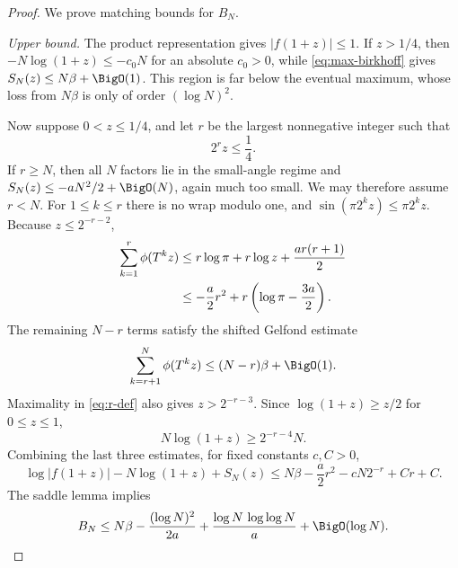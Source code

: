 \documentclass[11pt,oneside]{article}
\theoremstyle{definition}
\theoremstyle{remark}
\newcommand{\T}{T}
\begin{document}
\begin{proof}
We prove matching bounds for $B_N$.

\emph{Upper bound.}
The product representation gives $|f(1+z)|\le1$.  If $z>1/4$, then
$-N\log(1+z)\le-c_0N$ for an absolute $c_0>0$, while
\eqref{eq:max-birkhoff} gives $S_N(z)\le N\beta+\BigO(1)$.
This region is far below the eventual maximum, whose loss from $N\beta$ is
only of order $(\log N)^2$.

Now suppose $0<z\le1/4$, and let $r$ be the largest nonnegative integer such
that
\begin{equation}
 2^rz\le\frac14.                                            \label{eq:r-def}
\end{equation}
If $r\ge N$, then all $N$ factors lie in the small-angle regime and
$S_N(z)\le-aN^2/2+\BigO(N)$, again much too small.  We may therefore assume
$r<N$.  For $1\le k\le r$ there is no wrap modulo one, and
$\sin(\pi2^kz)\le\pi2^kz$.  Because
$z\le2^{-r-2}$,
\begin{align}
 \sum_{k=1}^{r}\phi(\T^kz)
 &\le r\log\pi+r\log z+\frac{ar(r+1)}2\notag\\
 &\le-\frac a2r^2+r\left(\log\pi-\frac{3a}{2}\right).     \label{eq:transient-upper}
\end{align}
The remaining $N-r$ terms satisfy the shifted Gelfond estimate
\[
 \sum_{k=r+1}^{N}\phi(\T^kz)
 \le(N-r)\beta+\BigO(1).
\]
Maximality in \eqref{eq:r-def} also gives $z>2^{-r-3}$.  Since
$\log(1+z)\ge z/2$ for $0\le z\le1$,
\[
 N\log(1+z)\ge2^{-r-4}N.
\]
Combining the last three estimates, for fixed constants $c,C>0$,
\begin{equation}
 \log|f(1+z)|-N\log(1+z)+S_N(z)
 \le N\beta-\frac a2r^2-cN2^{-r}+Cr+C.                    \label{eq:BN-upper-r}
\end{equation}
The saddle lemma implies
\begin{equation}
 B_N\le N\beta-
\frac{(\log N)^2}{2a}
 +\frac{\log N\,\log\log N}{a}+\BigO(\log N).             \label{eq:BN-upper}
\end{equation}


\end{proof}
\end{document}
